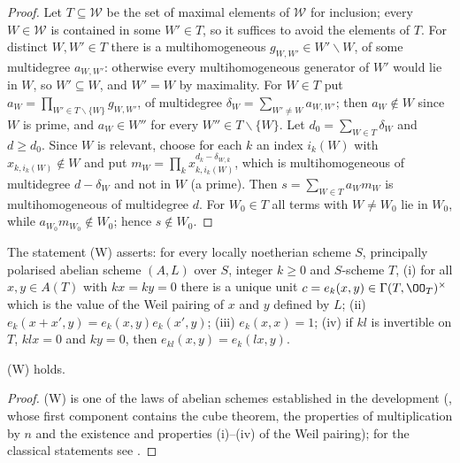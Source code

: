 \begin{proof}
Let $T\subseteq\mathcal W$ be the set of maximal elements of $\mathcal W$ for inclusion; every
$W\in\mathcal W$ is contained in some $W'\in T$, so it suffices to avoid the elements of $T$. For distinct
$W,W'\in T$ there is a multihomogeneous $g_{W,W'}\in W'\smallsetminus W$, of some multidegree
$a_{W,W'}$: otherwise every multihomogeneous generator of $W'$ would lie in $W$, so $W'\subseteq W$, and
$W'=W$ by maximality. For $W\in T$ put $a_W=\prod_{W'\in T\smallsetminus\{W\}}g_{W,W'}$, of multidegree
$\delta_W=\sum_{W'\ne W}a_{W,W'}$; then $a_W\notin W$ since $W$ is prime, and $a_W\in W''$ for every
$W''\in T\smallsetminus\{W\}$. Let $d_0=\sum_{W\in T}\delta_W$ and $d\ge d_0$. Since $W$ is relevant, choose
for each $k$ an index $i_k(W)$ with $x_{k,i_k(W)}\notin W$ and put
$m_W=\prod_kx_{k,i_k(W)}^{d_k-\delta_{W,k}}$, which is multihomogeneous of multidegree $d-\delta_W$ and not in
$W$ (a prime). Then $s=\sum_{W\in T}a_Wm_W$ is multihomogeneous of multidegree $d$. For $W_0\in T$ all terms
with $W\ne W_0$ lie in $W_0$, while $a_{W_0}m_{W_0}\notin W_0$; hence $s\notin W_0$.
\end{proof}

\begin{definition}\label{pf:tower:def-weil}
The statement (W) asserts: for every locally noetherian scheme $S$, principally polarised abelian scheme
$(A,L)$ over $S$, integer $k\ge0$ and $S$-scheme $T$, (i) for all $x,y\in A(T)$ with $kx=ky=0$ there is a
unique unit $c=e_k(x,y)\in\Gamma(T,\OO_T)^\times$ which is the value of the Weil pairing of $x$ and $y$
defined by $L$; (ii) $e_k(x+x',y)=e_k(x,y)e_k(x',y)$; (iii) $e_k(x,x)=1$; (iv) if $kl$ is invertible on $T$,
$klx=0$ and $ky=0$, then $e_{kl}(x,y)=e_k(lx,y)$.
\end{definition}

\begin{lemma}\label{pf:tower:weil}
\textup{(W)} holds.
\end{lemma}

\begin{proof}
(W) is one of the laws of abelian schemes established in the development
(, whose first component contains the cube theorem, the properties of
multiplication by $n$ and the existence and properties (i)--(iv) of the Weil pairing); for the classical
statements see \cite[\S\S6, 10, 20, 23]{Mumford1970}.
\end{proof}

